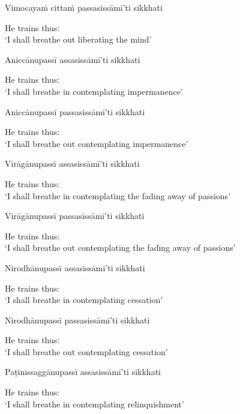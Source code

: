 Vimocayaṁ cittaṁ passasissāmī'ti sikkhati

\begin{english}
  He trains thus:\\
  `I shall breathe out liberating the mind'
\end{english}

Aniccānupassī assasissāmī'ti sikkhati

\begin{english}
  He trains thus:\\
  `I shall breathe in contemplating impermanence'
\end{english}

Aniccānupassī passasissāmī'ti sikkhati

\begin{english}
  He trains thus:\\
  `I shall breathe out contemplating impermanence'
\end{english}

Virāgānupassī assasissāmī'ti sikkhati

\begin{english}
  He trains thus:\\
  `I shall breathe in contemplating the fading away of passions'
\end{english}

Virāgānupassī passasissāmī'ti sikkhati

\begin{english}
  He trains thus:\\
  `I shall breathe out contemplating the fading away of passions'
\end{english}

Nirodhānupassī assasissāmī'ti sikkhati

\begin{english}
  He trains thus:\\
  `I shall breathe in contemplating cessation'
\end{english}

Nirodhānupassī passasissāmī'ti sikkhati

\begin{english}
  He trains thus:\\
  `I shall breathe out contemplating cessation'
\end{english}

Paṭinissaggānupassī assasissāmī'ti sikkhati

\begin{english}
  He trains thus:\\
  `I shall breathe in contemplating relinquishment'
\end{english}

